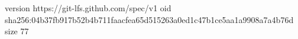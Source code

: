 version https://git-lfs.github.com/spec/v1
oid sha256:04b37fb917b52b4b711faacfea65d515263a0ed1c47b1ce5aa1a9908a7a4b76d
size 77
